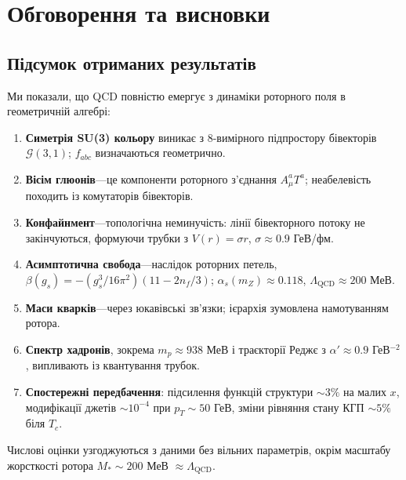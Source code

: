 \documentclass[11pt,a4paper]{article}
\newcommand{\Cl}{\mathcal{G}}
\theoremstyle{definition}
\theoremstyle{plain}
\theoremstyle{remark}
\begin{document}
\vspace{1em}

\section{Обговорення та висновки}
\label{sec:discussion}

\subsection{Підсумок отриманих результатів}

Ми показали, що QCD повністю емергує з динаміки роторного поля в геометричній алгебрі:

\begin{enumerate}[leftmargin=*,itemsep=3pt]
  \item \textbf{Симетрія SU(3) кольору} виникає з 8-вимірного підпростору бівекторів $\Cl(3,1)$; $f_{abc}$ визначаються геометрично.

  \item \textbf{Вісім глюонів}—це компоненти роторного з’єднання $A_\mu^aT^a$; неабелевість походить із комутаторів бівекторів.

  \item \textbf{Конфайнмент}—топологічна неминучість: лінії бівекторного потоку не закінчуються, формуючи трубки з $V(r)=\sigma r$, $\sigma\approx 0{.}9$ ГеВ/фм.

  \item \textbf{Асимптотична свобода}—наслідок роторних петель, $\beta(g_s)=-(g_s^3/16\pi^2)(11-2n_f/3)$; $\alpha_s(m_Z)\approx 0{.}118$, $\Lambda_{\mathrm{QCD}}\approx 200$ МеВ.

  \item \textbf{Маси кварків}—через юкавівські зв’язки; ієрархія зумовлена намотуванням ротора.

  \item \textbf{Спектр хадронів}, зокрема $m_p\approx 938$ МеВ і траєкторії Реджє з $\alpha'\approx 0{.}9$ ГеВ$^{-2}$, випливають із квантування трубок.

  \item \textbf{Спостережні передбачення}: підсилення функцій структури $\sim 3\%$ на малих $x$, модифікації джетів $\sim 10^{-4}$ при $p_T\sim 50$ ГеВ, зміни рівняння стану КГП $\sim 5\%$ біля $T_c$.
\end{enumerate}

Числові оцінки узгоджуються з даними без вільних параметрів, окрім масштабу жорсткості ротора $M_\ast\sim 200$ МеВ $\approx \Lambda_{\mathrm{QCD}}$.
\end{document}
